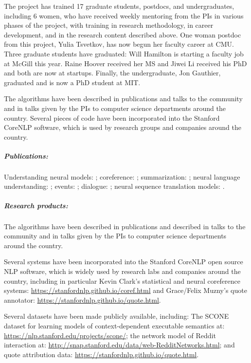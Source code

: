 \documentclass{article}
\begin{document}
The project has trained 17 graduate students, postdocs, and undergraduates, including 6 women, who have received weekly mentoring from the PIs in various phases of the project, with training in research methodology, in career development, and in the research content described above. One woman postdoc from this project, Yulia Tsvetkov, has now begun her faculty career at CMU. Three graduate students have graduated: Will Hamilton is starting a faculty job at McGill this year. Raine Hoover received her MS and Jiwei Li received his PhD and both are now at startups. Finally, the undergraduate, Jon Gauthier, graduated and is now a PhD student at MIT.

The algorithms have been described in publications and talks to the community and in talks given by the PIs to computer science departments around the country. Several pieces of code have been incorporated into the Stanford CoreNLP software, which is used by research groups and companies around the country.



\subparagraph{Publications:} Understanding neural models: \cite{li2015tree,khandelwal2018lm}; coreference: \cite{clark2016deep,clark2016improving}; summarization: \cite{see2016compression}; neural language understanding: \cite{bowman2016spinn,hamilton2016cultural,hamilton2016diachronic}; events: \cite{huang2016events}; dialogue: \cite{li2017adversarial,muzny2017twostage,guu2017bridging}; neural sequence translation models: \cite{luong2016acl_hybrid,wuebker2016acl}.


\subparagraph{Research products:}

The algorithms have been described in publications and described in talks to the community and in talks given by the PIs to computer science departments around the country.

 Several systems have been incorporated into the Stanford CoreNLP open source NLP software, which is widely used by research labs and companies around the country, including in particular Kevin Clark's statistical and neural coreference systems: \url{https://stanfordnlp.github.io/coref.html} and Grace/Felix Muzny's quote annotator: \url{https://stanfordnlp.github.io/quote.html}.

Several datasets have been made publicly available, including: The SCONE dataset for learning models of context-dependent executable semantics at: \url{https://nlp.stanford.edu/projects/scone/}; the network model of Reddit interaction at: \url{http://snap.stanford.edu/data/web-RedditNetworks.html}; and quote attribution data: \url{https://stanfordnlp.github.io/quote.html}.




\end{document}
